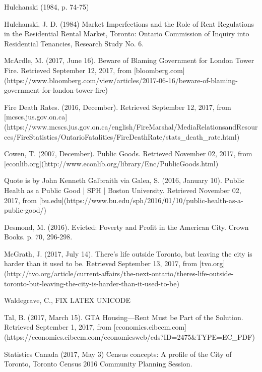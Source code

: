 \begin{thebibliography}{9}
   Hulchanski (1984, p. 74-75)

    Hulchanski, J. D. (1984) Market Imperfections and the Role of Rent Regulations in the Residential Rental Market, Toronto: Ontario Commission of Inquiry into Residential Tenancies, Research Study No. 6.

  McArdle, M. (2017, June 16). Beware of Blaming Government for London Tower Fire. Retrieved September 12, 2017, from [bloomberg.com](https://www.bloomberg.com/view/articles/2017-06-16/beware-of-blaming-government-for-london-tower-fire)

  Fire Death Rates. (2016, December). Retrieved September 12, 2017, from [mcscs.jus.gov.on.ca](https://www.mcscs.jus.gov.on.ca/english/FireMarshal/MediaRelationsandResources/FireStatistics/OntarioFatalities/FireDeathRate/stats\_death\_rate.html)

  Cowen, T. (2007, December). Public Goods. Retrieved November 02, 2017, from [econlib.org](http://www.econlib.org/library/Enc/PublicGoods.html)

  Quote is by John Kenneth Galbraith via Galea, S. (2016, January 10). Public Health as a Public Good | SPH | Boston University. Retrieved November 02, 2017, from [bu.edu](https://www.bu.edu/sph/2016/01/10/public-health-as-a-public-good/)

   Desmond, M. (2016). Evicted: Poverty and Profit in the American City. Crown Books. p. 70, 296-298.

  McGrath, J. (2017, July 14). There's life outside Toronto, but leaving the city is harder than it used to be. Retrieved September 13, 2017, from [tvo.org](http://tvo.org/article/current-affairs/the-next-ontario/theres-life-outside-toronto-but-leaving-the-city-is-harder-than-it-used-to-be)

   Waldegrave, C., FIX LATEX UNICODE %

  Tal, B. (2017, March 15). GTA Housing—Rent Must be Part of the Solution. Retrieved September 1, 2017, from [economics.cibccm.com](https://economics.cibccm.com/economicsweb/cds?ID=2475\&TYPE=EC\_PDF)

  Statistics Canada (2017, May 3) Census concepts: A profile of the City of Toronto, Toronto Census 2016 Community Planning Session.


\end{thebibliography}
